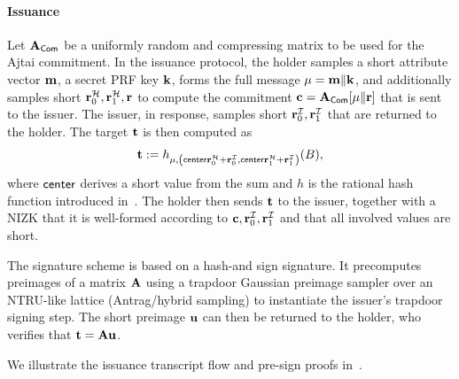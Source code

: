 \paragraph*{Issuance}
Let $\mathbf{A}_{\mathsf{Com}}$ be a uniformly random and compressing matrix to be used for the Ajtai commitment. In the issuance
protocol, the holder samples a short attribute vector \(\mathbf{m}\), a secret PRF key \(\mathbf{k}\), forms the full message
\(\mathbf{\mu}=\mathbf{m}\Vert \mathbf{k}\), and additionally samples short \(\mathbf{r}_0^{\mathcal{H}},\mathbf{r}_1^{\mathcal{H}},\mathbf{r}\) to compute the
commitment \(\mathbf{c}=\mathbf{A}_{\mathsf{Com}}[\mathbf{\mu} \Vert \mathbf{r}]\) that is sent to the issuer. The issuer, in response, samples short
\(\mathbf{r}_0^{\mathcal{I}},\mathbf{r}_1^{\mathcal{I}}\) that are returned to the holder. The target \(\mathbf{t}\) is then computed as
\[
\mathbf{t} := h_{\mathbf{\mu},\left(\mathsf{center}{\mathbf{r}_0^{\mathcal{H}}+\mathbf{r}_0^{\mathcal{I}}},\mathsf{center}{\mathbf{r}_1^{\mathcal{H}}+\mathbf{r}_1^{\mathcal{I}}}\right)}(B),
\]
where \(\mathsf{center}\) derives a short value from the sum and \(h\) is the rational hash function introduced
in~\cite{C:BLNS23}. The holder then sends \(\mathbf{t}\) to the issuer, together with a NIZK that it is well-formed
according to \(\mathbf{c},\mathbf{r}_0^{\mathcal{I}},\mathbf{r}_1^{\mathcal{I}}\) and that all involved values are short.

 The signature scheme is based on a hash-and sign signature. It precomputes preimages of a matrix $\mathbf{A}$ using a trapdoor Gaussian preimage sampler over an
	NTRU-like lattice (Antrag/hybrid sampling) to instantiate the issuer’s trapdoor signing step. The short preimage $\mathbf{u}$ can then be returned to the holder, who verifies that $\mathbf{t} = \mathbf{A} \mathbf{u}$.
	
	We illustrate the issuance transcript flow and pre-sign proofs in~.
	


